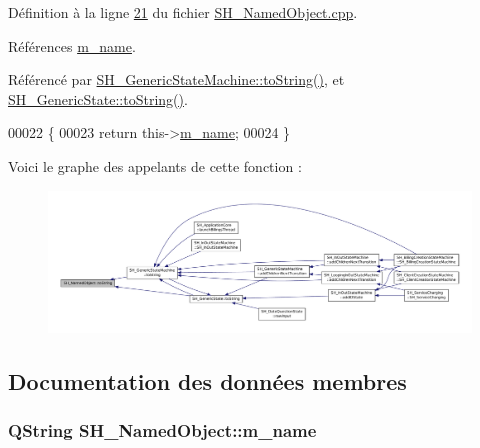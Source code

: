 Définition à la ligne \hyperlink{SH__NamedObject_8cpp_source_l00021}{21} du fichier \hyperlink{SH__NamedObject_8cpp_source}{S\-H\-\_\-\-Named\-Object.\-cpp}.



Références \hyperlink{classSH__NamedObject_a7f8e3346256986c337a792339ea5a015}{m\-\_\-name}.



Référencé par \hyperlink{classSH__GenericStateMachine_a85c0c1c9d258ae991f84667412fa47cd}{S\-H\-\_\-\-Generic\-State\-Machine\-::to\-String()}, et \hyperlink{classSH__GenericState_a7779babbb40f3f8faa71112204d9804f}{S\-H\-\_\-\-Generic\-State\-::to\-String()}.


\begin{DoxyCode}
00022 \{
00023     \textcolor{keywordflow}{return} this->\hyperlink{classSH__NamedObject_a7f8e3346256986c337a792339ea5a015}{m\_name};
00024 \}
\end{DoxyCode}


Voici le graphe des appelants de cette fonction \-:
\nopagebreak
\begin{figure}[H]
\begin{center}
\leavevmode
\includegraphics[width=350pt]{classSH__NamedObject_a9f4b19df6a96a17daaf1060b3019ef47_icgraph}
\end{center}
\end{figure}




\subsection{Documentation des données membres}
\hypertarget{classSH__NamedObject_a7f8e3346256986c337a792339ea5a015}{
\subsubsection[{m\-\_\-name}]{\setlength{\rightskip}{0pt plus 5cm}Q\-String S\-H\-\_\-\-Named\-Object\-::m\-\_\-name\hspace{0.3cm}{\ttfamily [private]}}}\label{classSH__NamedObject_a7f8e3346256986c337a792339ea5a015}


